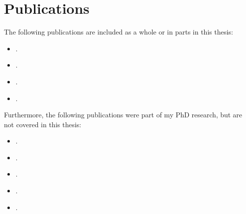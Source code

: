 \chapter*{Publications}

The following publications are included as a whole or in parts in
this thesis:
\begin{itemize}
    \item {}.
    \item {}.
    \item {}.
    \item {}.
\end{itemize}

Furthermore, the following publications were part of my PhD research, but are
not covered in this thesis:
\begin{itemize}
    \item {}.
    \item {}.
    \item {}.
    \item {}.
    \item {}.
\end{itemize}

